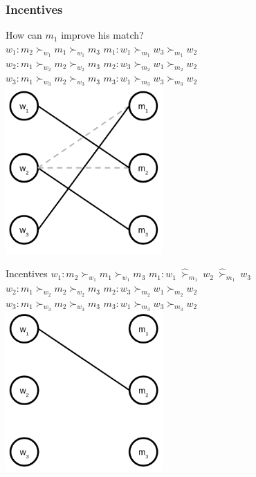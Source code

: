 \begin{frame}
\frametitle{Incentives}
How can $m_1$ improve his match? \\
$w_1: m_2 \succ_{w_1} m_1 \succ_{w_1} m_3$ \tab $m_1: w_1 \succ_{m_1} w_3 \succ_{m_1} w_2$ \\
$w_2: m_1 \succ_{w_2} m_2 \succ_{w_2} m_3$ \tab $m_2: w_3 \succ_{m_2} w_1 \succ_{m_2} w_2$ \\
$w_3: m_1 \succ_{w_3} m_2 \succ_{w_3} m_3$ \tab $m_3: w_1 \succ_{m_3} w_3 \succ_{m_3} w_2$ \\
\centering
\includegraphics[width=6cm]{img/matching/da5.png}
\end{frame}

\begin{frame}{Incentives}
    $w_1: m_2 \succ_{w_1} m_1 \succ_{w_1} m_3$ \tab $m_1: w_1 \ \hat{\succ}_{m_1} \ w_2 \ \hat{\succ}_{m_1} \ w_3$ \\
    $w_2: m_1 \succ_{w_2} m_2 \succ_{w_2} m_3$ \tab $m_2: w_3 \succ_{m_2} w_1 \succ_{m_2} w_2$ \\
    $w_3: m_1 \succ_{w_3} m_2 \succ_{w_3} m_3$ \tab $m_3: w_1 \succ_{m_3} w_3 \succ_{m_3} w_2$ \\
    \centering
    \includegraphics[width=6cm]{img/matching/da1.png}
\end{frame}

